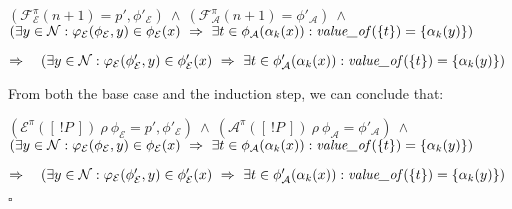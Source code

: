 \documentclass[10pt,a4paper,final,oneside,fleqn]{book}
\begin{document}
\noindent
$(\mathcal{F}_\mathcal{E}^\pi(n+1)=p',\phi'_\mathcal{E})~\wedge~(\mathcal{F}_\mathcal{A}^\pi(n+1)=\phi'_\mathcal{A})~\wedge$\\
$(\exists y\in\mathcal{N}:\varphi_\mathcal{E}(\phi_\mathcal{E},y)\in\phi_\mathcal{E}(x)~\Rightarrow~\exists t\in\phi_\mathcal{A}(\alpha_k(x)):\mbox{{\itshape value\_of\/}}(\{t\})=\{\alpha_k(y)\})$\vspace{5mm}

\noindent
$\Rightarrow~~~(\exists y\in\mathcal{N}:\varphi_\mathcal{E}(\phi'_\mathcal{E},y)\in\phi'_\mathcal{E}(x)~\Rightarrow~\exists t\in\phi'_\mathcal{A}(\alpha_k(x)):\mbox{{\itshape value\_of\/}}(\{t\})=\{\alpha_k(y)\})$\vspace{5mm}

\noindent
From both the base case and the induction step, we can conclude that:

\noindent
$(\mathcal{E}^\pi(\![~!P~]\!)~\rho~\phi_\mathcal{E}=p',\phi'_\mathcal{E})~\wedge~(\mathcal{A}^\pi(\![~!P~]\!)~\rho~\phi_\mathcal{A}=\phi'_\mathcal{A})~\wedge$\\
$(\exists y\in\mathcal{N}:\varphi_\mathcal{E}(\phi_\mathcal{E},y)\in\phi_\mathcal{E}(x)~\Rightarrow~\exists t\in\phi_\mathcal{A}(\alpha_k(x)):\mbox{{\itshape value\_of\/}}(\{t\})=\{\alpha_k(y)\})$\vspace{5mm}

\noindent
$\Rightarrow~~~(\exists y\in\mathcal{N}:\varphi_\mathcal{E}(\phi'_\mathcal{E},y)\in\phi'_\mathcal{E}(x)~\Rightarrow~\exists t\in\phi'_\mathcal{A}(\alpha_k(x)):\mbox{{\itshape value\_of\/}}(\{t\})=\{\alpha_k(y)\})$

\vfill
\noindent
$\square$
\newpage
\end{document}
